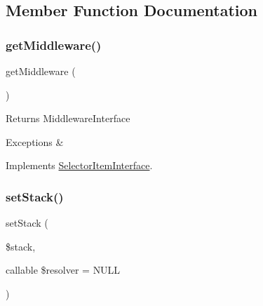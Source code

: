 \subsection{Member Function Documentation}
\mbox{\label{class_pes_1_1_middleware_1_1_selector_item_af09a4d42693ca813040ddf1ebb7a306f}} 
\subsubsection{\texorpdfstring{get\+Middleware()}{getMiddleware()}}
{\footnotesize\ttfamily get\+Middleware (\begin{DoxyParamCaption}{ }\end{DoxyParamCaption})}

\begin{DoxyReturn}{Returns}
Middleware\+Interface 
\end{DoxyReturn}

\begin{DoxyExceptions}{Exceptions}
{\em } & \\
\hline
\end{DoxyExceptions}


Implements \mbox{\hyperlink{interface_pes_1_1_middleware_1_1_selector_item_interface}{Selector\+Item\+Interface}}.

\mbox{\label{class_pes_1_1_middleware_1_1_selector_item_a45338158e6ea2a7b58612339ccc85717}} 
\subsubsection{\texorpdfstring{set\+Stack()}{setStack()}}
{\footnotesize\ttfamily set\+Stack (\begin{DoxyParamCaption}\item[{}]{\$stack,  }\item[{callable}]{\$resolver = {\ttfamily NULL} }\end{DoxyParamCaption})}

